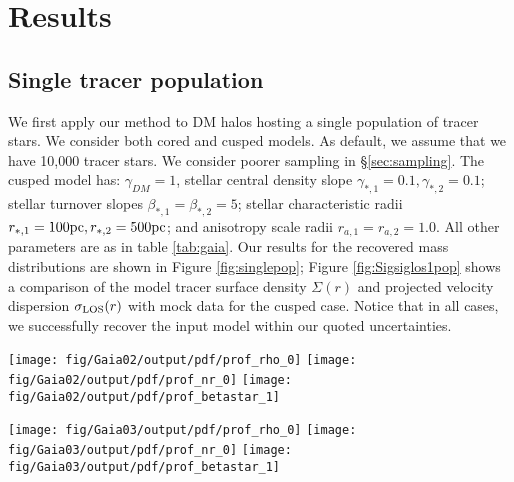 \section{Results}\label{sec:results}
\subsection{Single tracer population}
We first apply our method to DM halos hosting a single population of
tracer stars. We consider both cored and cusped models. As default, we
assume that we have 10,000 tracer stars. We consider poorer sampling
in \S\ref{sec:sampling}. The cusped model has: $\gamma_{DM}=1$,
stellar central density slope $\gamma_{*,1}=0.1, \gamma_{*,2}=0.1$;
stellar turnover slopes $\beta_{*,1}=\beta_{*,2}=5$; stellar
characteristic radii $r_{*,1}=100\mathrm{pc}, r_{*,2}=500\mathrm{pc}$; and anisotropy
scale radii $r_{a,1}=r_{a,2}=1.0$. All other parameters are as in
table \ref{tab:gaia}. Our results for the recovered mass distributions
are shown in Figure \ref{fig:singlepop}; Figure
\ref{fig:Sigsiglos1pop} shows a comparison of the model tracer surface
density $\Sigma(r)$ and projected velocity dispersion $\sigma_{\text{LOS}}(r)$
with mock data for the cusped case. Notice that in all cases, we
successfully recover the input model within our quoted uncertainties.


\begin{figure*}
    \begin{center}
        \texttt{[image: fig/Gaia02/output/pdf/prof\_rho\_0]}\hspace{-3mm}
        \texttt{[image: fig/Gaia02/output/pdf/prof\_nr\_0]}\hspace{-3mm}
        \texttt{[image: fig/Gaia02/output/pdf/prof\_betastar\_1]}

        \texttt{[image: fig/Gaia03/output/pdf/prof\_rho\_0]}\hspace{-3mm}
        \texttt{[image: fig/Gaia03/output/pdf/prof\_nr\_0]}\hspace{-3mm}
        \texttt{[image: fig/Gaia03/output/pdf/prof\_betastar\_1]}

        \caption{Reconstructed density for Gaia02
          (cored, top), and Gaia03 (cusped,
          bottom); logarithmic density slope; and
          velocity anisotropy profile, using all
          tracer stars, on the order of 3000. The input model
          profile is marked by the blue dashed
          line; the red line and grey contours
          show the median, 68\% and 95\%
          confidence intervals for our chains,
          respectively; the vertical green line
          marks the 3D half-light radius of the
          stars; and the gray lines show a sub-set
          of individual models. The full ensemble
          shown samples of accepted models in
          total.}
        \label{fig:singlepop}
    \end{center}
\end{figure*}

